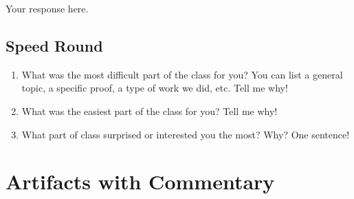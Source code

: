 \documentclass[12pt]{amsart}
\begin{document}
Your response here.

\subsection{Speed Round}
  \begin{enumerate}
  \item What was the most difficult part of the class for you?
    You can list a general topic, a specific proof, a type of work we
    did, etc. Tell me why! 
  \item What was the easiest part of the class for
    you? Tell me why! 
  \item What part of class surprised or interested you the
    most? Why? One sentence!
  \end{enumerate}

\section{Artifacts with Commentary}

\end{document}
